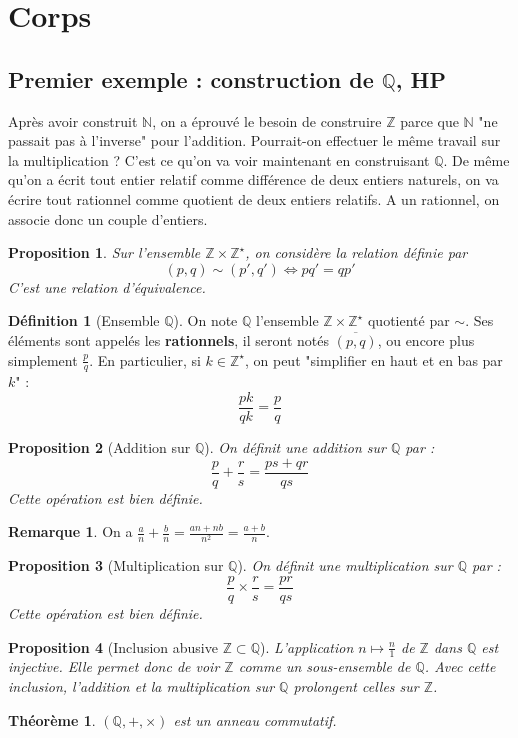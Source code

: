 \documentclass[french]{book}
\newcommand{\N}{\mathbb{N}}
\newcommand{\Z}{\mathbb{Z}}
\newcommand{\Q}{\mathbb{Q}}
\newcommand{\st}{^\star}
\theoremstyle{plain}
\newtheorem{thm}{Théorème}[chapter]
\newtheorem{prop}{Proposition}[chapter]
\theoremstyle{definition}
\newtheorem{dfn}{Définition}[chapter]
\newtheorem{rmq}{Remarque}[chapter]
\theoremstyle{remark}
\begin{document}
\section{Corps}
\subsection{Premier exemple : construction de $\Q$, HP}
Après avoir construit $\N$, on a éprouvé le besoin de construire $\Z$ parce que $\N$ "ne passait pas à l'inverse" pour l'addition. Pourrait-on effectuer le même travail sur la multiplication ? C'est ce qu'on va voir maintenant en construisant $\Q$. De même qu'on a écrit tout entier relatif comme différence de deux entiers naturels, on va écrire tout rationnel comme quotient de deux entiers relatifs. A un rationnel, on associe donc un couple d'entiers.
\begin{prop}
	Sur l'ensemble $\Z\times\Z\st$, on considère la relation définie par $$(p,q)\sim(p',q')\iff pq'=qp'$$ C'est une relation d'équivalence.
\end{prop}
\begin{dfn}[Ensemble $\Q$]
	On note $\Q$ l'ensemble $\Z\times\Z\st$ quotienté par $\sim$. Ses éléments sont appelés les \textbf{rationnels}, il seront notés $\overline{(p,q)}$, ou encore plus simplement $\displaystyle\frac{p}{q}$. En particulier, si $k\in\Z\st$, on peut "simplifier en haut et en bas par $k$" : $$\frac{pk}{qk}=\frac{p}{q}$$
\end{dfn}
\begin{prop}[Addition sur $\Q$]
	On définit une addition sur $\Q$ par : $$\frac{p}{q}+\frac{r}{s}=\frac{ps+qr}{qs}$$ Cette opération est bien définie.
\end{prop}
\begin{rmq}
	On a $\displaystyle\frac{a}{n}+\frac{b}{n}=\frac{an+nb}{n^2}=\frac{a+b}{n}$.
\end{rmq}
\begin{prop}[Multiplication sur $\Q$]
	On définit une multiplication sur $\Q$ par : $$\frac{p}{q}\times\frac{r}{s}=\frac{pr}{qs}$$ Cette opération est bien définie.
\end{prop}
\begin{prop}[Inclusion abusive $\Z\subset\Q$]
	L'application $n\mapsto\displaystyle\frac{n}{1}$ de $\Z$ dans $\Q$ est injective. Elle permet donc de voir $\Z$ comme un sous-ensemble de $\Q$. Avec cette inclusion, l'addition et la multiplication sur $\Q$ prolongent celles sur $\Z$.
\end{prop}
\begin{thm}
	$(\Q,+,\times)$ est un anneau commutatif.
\end{thm}
\end{document}
